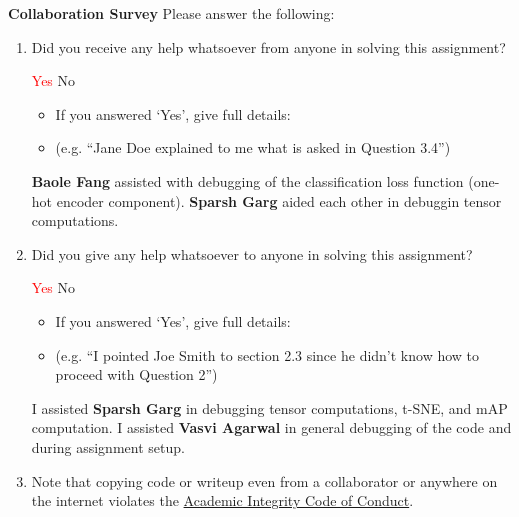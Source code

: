 \documentclass[11pt,addpoints,answers]{exam}
\numberwithin{equation}{section} %
\numberwithin{figure}{section} %
\numberwithin{table}{section} %
\begin{document}
\clearpage

\textbf{Collaboration Survey} Please answer the following:

\begin{enumerate}
    \item Did you receive any help whatsoever from anyone in solving this assignment?
    \begin{checkboxes}
     \choice \textcolor{red}{Yes}
     \choice No
    \end{checkboxes}
    \begin{itemize}
        \item If you answered `Yes', give full details:
        \item (e.g. “Jane Doe explained to me what is asked in Question 3.4”)
    \end{itemize}

    \begin{tcolorbox}[fit,height=3cm,blank, borderline={1pt}{-2pt},nobeforeafter]
    \textbf{Baole Fang} assisted with debugging of the classification loss function (one-hot encoder component).
    \textbf{Sparsh Garg} aided each other in debuggin tensor computations.
    \end{tcolorbox}

    \item Did you give any help whatsoever to anyone in solving this assignment?
    \begin{checkboxes}
     \choice \textcolor{red}{Yes}
     \choice No
    \end{checkboxes}
    \begin{itemize}
        \item If you answered `Yes', give full details:
        \item (e.g. “I pointed Joe Smith to section 2.3 since he didn’t know how to proceed with Question 2”)
    \end{itemize}

    \begin{tcolorbox}[fit,height=3cm,blank, borderline={1pt}{-2pt},nobeforeafter]
    I assisted \textbf{Sparsh Garg} in debugging tensor computations, t-SNE, and mAP computation.
    I assisted \textbf{Vasvi Agarwal} in general debugging of the code and during assignment setup.

    \end{tcolorbox}

    \item Note that copying code or writeup even from a collaborator or anywhere on the internet violates the \href{hhttps://www.cmu.edu/policies/student-and-student-life/academic-integrity.html}{Academic Integrity Code of Conduct}.
\end{enumerate}
\end{document}
